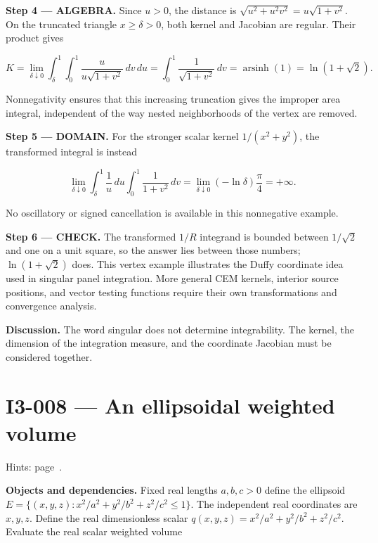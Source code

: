 \documentclass[11pt,oneside,openany]{book}
\begin{document}
\begingroup\color{AlgebraBlue}
\textbf{Step 4 --- ALGEBRA.} Since \(u>0\), the distance is \(\sqrt{u^2+u^2v^2}=u\sqrt{1+v^2}\). On the truncated triangle \(x\ge\delta>0\), both kernel and Jacobian are regular. Their product gives

\[
K=\lim_{\delta\downarrow0}\int_\delta^1\int_0^1
\frac{u}{u\sqrt{1+v^2}}\,dv\,du
=\int_0^1\frac{1}{\sqrt{1+v^2}}\,dv
=\operatorname{arsinh}(1)=\ln(1+\sqrt2).
\]

Nonnegativity ensures that this increasing truncation gives the improper area integral, independent of the way nested neighborhoods of the vertex are removed.

\endgroup
\begin{DomainStep}
\textbf{Step 5 --- DOMAIN.} For the stronger scalar kernel \(1/(x^2+y^2)\), the transformed integral is instead

\[
\lim_{\delta\downarrow0}\int_\delta^1\frac{1}{u}\,du\int_0^1\frac{1}{1+v^2}\,dv
=\lim_{\delta\downarrow0}(-\ln\delta)\frac{\pi}{4}=+\infty.
\]

No oscillatory or signed cancellation is available in this nonnegative example.

\end{DomainStep}
\textbf{Step 6 --- CHECK.} The transformed \(1/R\) integrand is bounded between \(1/\sqrt2\) and one on a unit square, so the answer lies between those numbers; \(\ln(1+\sqrt2)\) does. This vertex example illustrates the Duffy coordinate idea used in singular panel integration. More general CEM kernels, interior source positions, and vector testing functions require their own transformations and convergence analysis.

\textbf{Discussion.} The word singular does not determine integrability. The kernel, the dimension of the integration measure, and the coordinate Jacobian must be considered together.
\clearpage
\section{I3-008 --- An ellipsoidal weighted volume}
\label{problem:I3-008}
{\small Hints: page~\pageref{hints:I3-008}.}\par\medskip

\textbf{Objects and dependencies.} Fixed real lengths \(a,b,c>0\) define the ellipsoid \(E=\{(x,y,z):x^2/a^2+y^2/b^2+z^2/c^2\le1\}\). The independent real coordinates are \(x,y,z\). Define the real dimensionless scalar \(q(x,y,z)=x^2/a^2+y^2/b^2+z^2/c^2\). Evaluate the real scalar weighted volume
\end{document}
